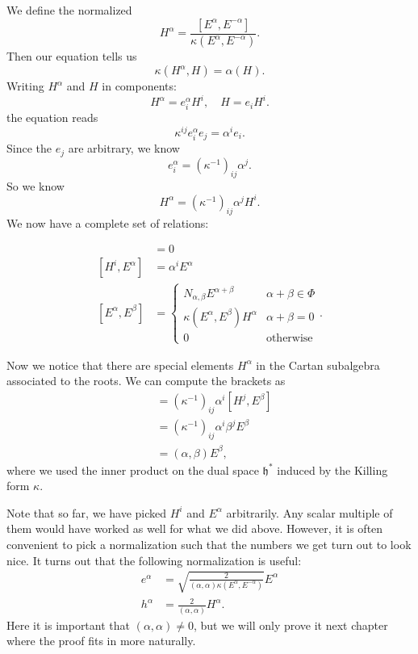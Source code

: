 \documentclass[a4paper]{article}
\begin{document}
We define the normalized
\[
  H^\alpha = \frac{[E^\alpha, E^{-\alpha}]}{\kappa(E^\alpha, E^{-\alpha})}.
\]
Then our equation tells us
\[
  \kappa(H^\alpha, H) = \alpha(H).
\]
Writing $H^\alpha$ and $H$ in components:
\[
  H^\alpha = e_i^\alpha H^i,\quad H = e_i H^i.
\]
the equation reads
\[
  \kappa^{ij}e^\alpha_i e_j = \alpha^i e_i.
\]
Since the $e_j$ are arbitrary, we know
\[
  e^\alpha_i = (\kappa^{-1})_{ij} \alpha^j.
\]
So we know
\[
  H^\alpha = (\kappa^{-1})_{ij} \alpha^j H^i.
\]
We now have a complete set of relations:
\begin{thm}
  \begin{align*}
    [H^i, H^j] &= 0\\
    [H^i, E^\alpha] &= \alpha^i E^\alpha\\
    [E^\alpha, E^\beta] &=
    \begin{cases}
      N_{\alpha, \beta}E^{\alpha + \beta} & \alpha + \beta \in \Phi\\
      \kappa(E^\alpha, E^\beta) H^\alpha & \alpha + \beta = 0\\
      0 & \text{otherwise}
    \end{cases}.
  \end{align*}
\end{thm}
Now we notice that there are special elements $H^\alpha$ in the Cartan subalgebra associated to the roots. We can compute the brackets as
\begin{align*}
  [H^\alpha, E^\beta] &= (\kappa^{-1})_{ij} \alpha^i [H^j, E^\beta]\\
  &= (\kappa^{-1})_{ij}\alpha^i \beta^j E^\beta\\
  &= (\alpha, \beta) E^\beta,
\end{align*}
where we used the inner product on the dual space $\mathfrak{h}^*$ induced by the Killing form $\kappa$.

Note that so far, we have picked $H^i$ and $E^\alpha$ arbitrarily. Any scalar multiple of them would have worked as well for what we did above. However, it is often convenient to pick a normalization such that the numbers we get turn out to look nice. It turns out that the following normalization is useful:
\begin{align*}
  e^\alpha &= \sqrt{\frac{2}{(\alpha, \alpha) \kappa(E^\alpha, E^{-\alpha})}} E^\alpha\\
  h^\alpha &= \frac{2}{(\alpha, \alpha)} H^\alpha.
\end{align*}
Here it is important that $(\alpha, \alpha) \not= 0$, but we will only prove it next chapter where the proof fits in more naturally.
\end{document}
